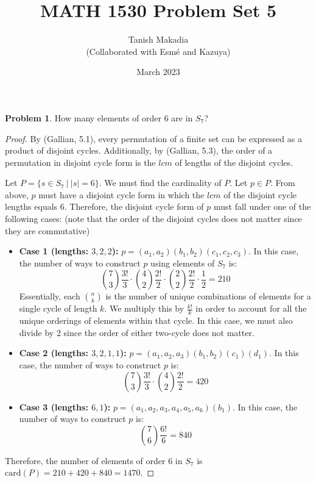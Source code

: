 \documentclass[12pt,reqno]{article}
\title{MATH 1530 Problem Set 5}
\author{Tanish Makadia\\\small{(Collaborated with Esmé and Kazuya)}}
\date{March 2023}
\theoremstyle{plain}
\theoremstyle{definition}
\newtheorem{problem}{Problem}
\begin{document}
\maketitle


\begin{problem} 
    How many elements of order 6 are in $S_7$?
\end{problem}

\begin{proof}
    By (Gallian, 5.1), every permutation of a finite set can be expressed as a product of
    disjoint cycles. Additionally, by (Gallian, 5.3), the order of a permutation in disjoint
    cycle form is the \(lcm\) of lengths of the disjoint cycles.
     
    Let \(P = \{s\in S_7\ |\ |s|=6\}\). We must find the cardinality of \(P\). Let \(p\in P\). From above, \(p\) must have a disjoint cycle form in which the \(lcm\) of
    the disjoint cycle lengths equals \(6\). Therefore, the disjoint cycle form of \(p\) must fall under one
    of the following cases: (note that the order of the disjoint cycles does not matter since they are commutative)
    \begin{itemize}
        \item \textbf{Case 1 (lengths: \(3, 2, 2\)):} \(p = (a_1, a_2)(b_1, b_2)(c_1, c_2, c_3)\). In this case, the number of ways to construct \(p\) using
        elements of \(S_7\) is:
        \[\binom{7}{3}\frac{3!}{3}\cdot\binom{4}{2}\frac{2!}{2}\cdot\binom{2}{2}\frac{2!}{2}\cdot \frac{1}{2}=210\]
        Essentially, each \(\binom{n}{k}\) is the number of unique combinations of elements for a single cycle of length \(k\). We multiply this by
        \(\frac{k!}{k}\) in order to account for all the unique orderings of elements within that cycle.
        In this case, we must also divide by \(2\) since the order of either two-cycle does not matter.
        \item \textbf{Case 2 (lengths: \(3,2,1,1\)):} \(p = (a_1,a_2,a_3)(b_1,b_2)(c_1)(d_1)\). In this case, the number of ways to construct
        \(p\) is:
        \[\binom{7}{3}\frac{3!}{3}\cdot\binom{4}{2}\frac{2!}{2}=420\]
        \item \textbf{Case 3 (lengths: \(6,1\)):} \(p=(a_1,a_2,a_3,a_4,a_5,a_6)(b_1)\). In this case, the number of ways to construct
        \(p\) is:
        \[\binom{7}{6}\frac{6!}{6}=840\]
    \end{itemize}
    Therefore, the number of elements of order \(6\) in \(S_7\) is \(\mathrm{card}(P)=210+420+840=1470\).
\end{proof}
\end{document}
